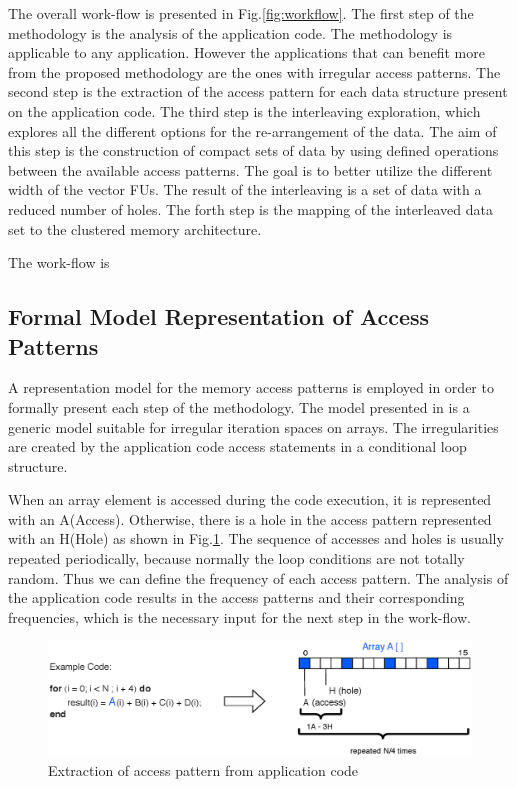 \documentclass[prodmode,acmtecs]{acmsmall}
\begin{document}
The overall work-flow is presented in Fig.\ref{fig:workflow}. 
The first step of the methodology is the analysis of the application code. 
The methodology is applicable to any application.
However the applications that can benefit more from the proposed methodology are the ones with irregular access patterns.
The second step is the extraction of the access pattern for each data structure present on the application code.
The third step is the interleaving exploration, which explores all the different options for the re-arrangement of the data.
The aim of this step is the construction of compact sets of data by using defined operations between the available access patterns.
The goal is to better utilize the different width of the vector FUs. 
The result of the interleaving is a set of data with a reduced number of holes.
The forth step is the mapping of the interleaved data set to the clustered memory architecture.

The work-flow is 

\subsection{Formal Model Representation of Access Patterns }

A representation model for the memory access patterns is employed in order to formally present each step of the methodology.
The model presented in \cite{Ang13} is a generic model suitable for irregular iteration spaces on arrays.
The irregularities are created by the application code access statements in a conditional loop structure.

When an array element is accessed during the code execution, it is represented with an A(Access).
Otherwise, there is a hole in the access pattern represented with an H(Hole) as shown in Fig.\ref{fig:pattern}.
The sequence of accesses and holes is usually repeated periodically, because normally the loop conditions are not totally random.
Thus we can define the frequency of each access pattern.
The analysis of the application code results in the access patterns and their corresponding frequencies, which is the necessary input for the next step in the work-flow.

\begin{figure}
\centering
	\includegraphics[scale = 0.6]{Images/AHpattern.eps} 
	\caption{Extraction of access pattern from application code}
	\label{fig:pattern}
\end{figure}
\end{document}
